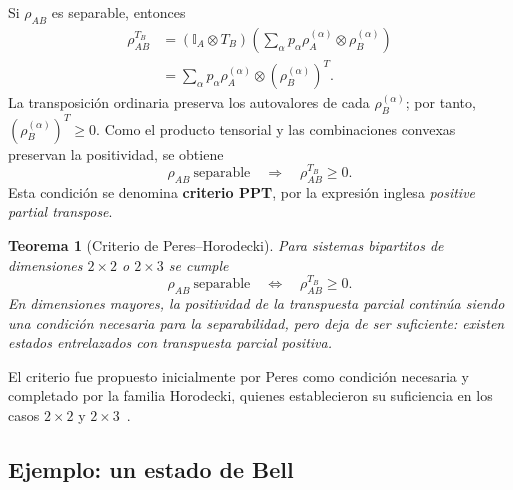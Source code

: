 \documentclass[12pt,a4paper]{article}
\theoremstyle{definition}
\theoremstyle{plain}
\newtheorem{teorema}[definicion]{Teorema}
\theoremstyle{remark}
\newcommand{\I}{\mathbb{I}}
\begin{document}
Si $\rho_{AB}$ es separable, entonces
\begin{align*}
    \rho_{AB}^{T_B}
    &=\left(\I_A\otimes T_B\right)
    \left(
        \sum_{\alpha}p_{\alpha}
        \rho_A^{(\alpha)}\otimes\rho_B^{(\alpha)}
    \right)\\
    &=\sum_{\alpha}p_{\alpha}
        \rho_A^{(\alpha)}\otimes
        \left(\rho_B^{(\alpha)}\right)^T.
\end{align*}
La transposición ordinaria preserva los autovalores de cada $\rho_B^{(\alpha)}$; por tanto, $\left(\rho_B^{(\alpha)}\right)^T\geq 0$. Como el producto tensorial y las combinaciones convexas preservan la positividad, se obtiene
\begin{equation*}
    \rho_{AB}\ \text{separable}
    \quad\Longrightarrow\quad
    \rho_{AB}^{T_B}\geq 0.
\end{equation*}
Esta condición se denomina \textbf{criterio PPT}, por la expresión inglesa \emph{positive partial transpose}.

\begin{teorema}[Criterio de Peres--Horodecki]
Para sistemas bipartitos de dimensiones $2\times 2$ o $2\times 3$ se cumple
\begin{equation*}
    \rho_{AB}\ \text{separable}
    \quad\Longleftrightarrow\quad
    \rho_{AB}^{T_B}\geq 0.
\end{equation*}
En dimensiones mayores, la positividad de la transpuesta parcial continúa siendo una condición necesaria para la separabilidad, pero deja de ser suficiente: existen estados entrelazados con transpuesta parcial positiva.
\end{teorema}

El criterio fue propuesto inicialmente por Peres como condición necesaria y completado por la familia Horodecki, quienes establecieron su suficiencia en los casos $2\times 2$ y $2\times 3$~\cite{Peres1996,Horodecki1996}.

\subsection{Ejemplo: un estado de Bell}
\end{document}
